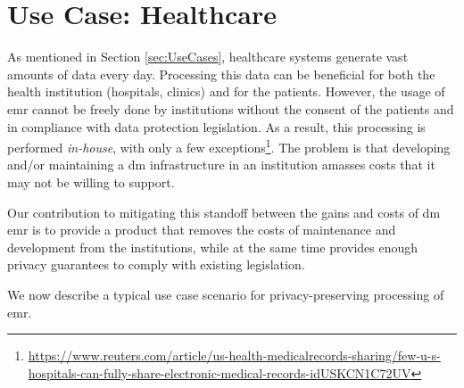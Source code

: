 
\section{Use Case: Healthcare}
\label{sec:usecaseHealthcare}


As mentioned in Section \ref{sec:UseCases}, healthcare systems generate vast amounts of data every day. Processing this data can be beneficial for both the health institution (hospitals, clinics) and for the patients. However, the usage of \ac{emr} cannot be freely done by institutions without the consent of the patients and in compliance with data protection legislation. As a result, this processing is performed \textit{in-house}, with only a few exceptions\footnote{\url{https://www.reuters.com/article/us-health-medicalrecords-sharing/few-u-s-hospitals-can-fully-share-electronic-medical-records-idUSKCN1C72UV}}. The problem is that developing and/or maintaining a \ac{dm} infrastructure in an institution amasses costs that it may not be willing to support.

Our contribution to mitigating this standoff between the gains and costs of \ac{dm} \ac{emr} is to provide a product that removes the costs of maintenance and development from the institutions, while at the same time provides enough privacy guarantees to comply with existing legislation.


We now describe a typical use case scenario for privacy-preserving processing of \ac{emr}.

